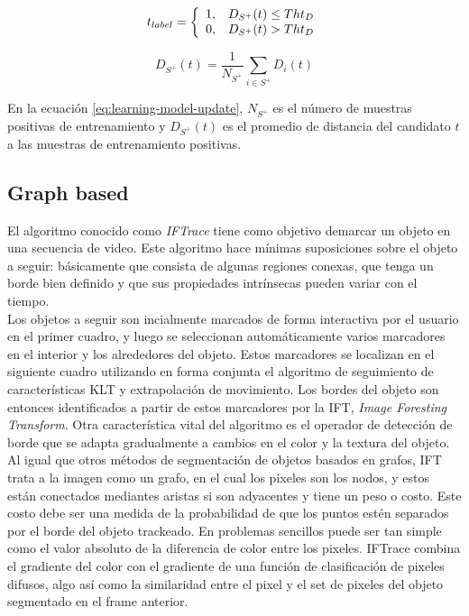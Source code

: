 \documentclass[a4paper,10pt]{article}
\begin{document}
\begin{equation}
    \label{eq:learning-model-update}
    t_{label} = \left\{ 
                \begin{array}{l l}
                    1, & D_{S^{+}}(t) \leq Tht_{D}\\
                    0, & D_{S^{+}}(t) >  Tht_{D}
                \end{array} \right.
\end{equation}

\begin{equation}
    D_{S^{+}}(t) = \dfrac{1}{N_{S^{+}}} \sum_{i \in S^{+}} D_{i}(t)
\end{equation}

En la ecuación \ref{eq:learning-model-update}, $N_{S^{+}}$ es el 
número de muestras positivas de entrenamiento y $D_{S^{+}}(t)$
es el promedio de distancia del candidato $t$ a las muestras
de entrenamiento positivas.

\subsection{Graph based}

El algoritmo conocido como \textit{IFTrace} tiene como objetivo demarcar un objeto en una secuencia de video. Este algoritmo hace mínimas
suposiciones sobre el objeto a seguir: básicamente que consista de algunas regiones conexas, que tenga un borde bien definido y que sus propiedades
intrínsecas pueden variar con el tiempo.\\
Los objetos a seguir son incialmente marcados de forma interactiva por el usuario en el primer cuadro, y luego se seleccionan automáticamente
varios marcadores en el interior y los alrededores del objeto. Estos marcadores se localizan en el siguiente cuadro utilizando en forma
conjunta el algoritmo de
seguimiento de características KLT \cite{KLT} y extrapolación de movimiento. Los bordes del objeto son entonces identificados a partir de estos marcadores por la IFT, 
\textit{Image Foresting Transform}\cite{IFT}. Otra característica vital del algoritmo es el operador de detección de borde que se adapta gradualmente a cambios en el 
color y la textura del objeto. \\

Al igual que otros métodos de segmentación de objetos basados en grafos, IFT trata a la imagen como un grafo, en el cual los pixeles son los nodos, y
estos están conectados mediantes aristas si son adyacentes y tiene un peso o costo. Este costo debe ser una medida de la probabilidad de que 
los puntos estén separados por el borde del objeto trackeado. En problemas sencillos puede ser tan simple como el valor absoluto de la diferencia de color 
entre los pixeles. IFTrace combina el gradiente del color con el gradiente de una función de clasificación de pixeles difusos, algo así como la similaridad entre el pixel 
y el set de pixeles del objeto segmentado en el frame anterior. \\
\end{document}
